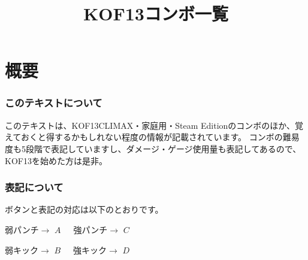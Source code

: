 \documentclass[a4j,11pt]{jarticle}
\title{KOF13コンボ一覧}
\author{}
\begin{document}
\maketitle
\thispagestyle{empty}
\tableofcontents %
\newpage
\part{概要}
\section{このテキストについて}
このテキストは、KOF13CLIMAX・家庭用・Steam Editionのコンボのほか、覚えておくと得するかもしれない程度の情報が記載されています。
コンボの難易度も5段階で表記していますし、ダメージ・ゲージ使用量も表記してあるので、KOF13を始めた方は是非。
\section{表記について}
ボタンと表記の対応は以下のとおりです。

\begin{screen}

 弱パンチ$\rightarrow$ $A$\ \ \ 強パンチ$\rightarrow$ $C$
 
 弱キック$\rightarrow$ $B$\ \ \ 強キック$\rightarrow$ $D$
\end{screen}
\vspace{11pt}
\end{document}
